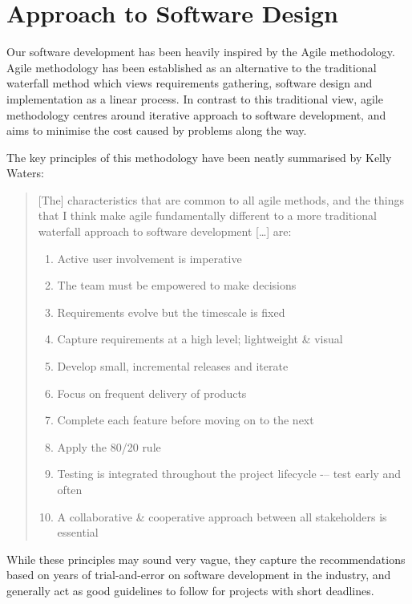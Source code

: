 \section{Approach to Software Design}
\label{sec:design_considerations}

Our software development has been heavily inspired by the Agile methodology\cite{_manifesto_????}.
Agile methodology has been established as an alternative to the traditional waterfall method which views requirements gathering, software design and implementation as a linear process.
In contrast to this traditional view, agile methodology centres around iterative approach to software development, and aims to minimise the cost caused by problems along the way.

The key principles of this methodology have been neatly summarised by Kelly Waters\cite{_what_????}:

\blockquote{
    [The] characteristics that are common to all agile methods, and the things that I think make agile fundamentally different to a more traditional waterfall approach to software development [\ldots] are:
    
    \begin{enumerate}
        \item Active user involvement is imperative
        \item The team must be empowered to make decisions
        \item Requirements evolve but the timescale is fixed
        \item Capture requirements at a high level; lightweight \& visual
        \item Develop small, incremental releases and iterate
        \item Focus on frequent delivery of products
        \item Complete each feature before moving on to the next
        \item Apply the 80/20 rule
        \item Testing is integrated throughout the project lifecycle -– test early and often
        \item A collaborative \& cooperative approach between all stakeholders is essential
    \end{enumerate}
}

While these principles may sound very vague, they capture the recommendations based on years of trial-and-error on software development in the industry, and generally act as good guidelines to follow for projects with short deadlines.

